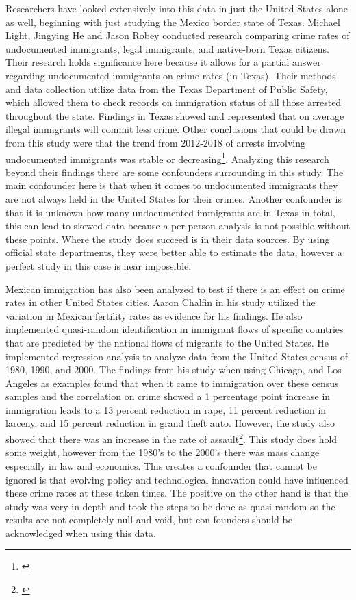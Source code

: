\documentclass[12pt,letterpaper]{article}
\begin{document}
    \indent     Researchers have looked extensively into this data in just the United States alone as well, beginning with just studying the Mexico border state of Texas. Michael Light, Jingying He and Jason Robey conducted research comparing crime rates of undocumented immigrants, legal immigrants, and native-born Texas citizens. Their research holds significance here because it allows for a partial answer regarding undocumented immigrants on crime rates (in Texas). Their methods and data collection utilize data from the Texas Department of Public Safety, which allowed them to check records on immigration status of all those arrested throughout the state. Findings in Texas showed and represented that on average illegal immigrants will commit less crime. Other conclusions that could be drawn from this study were that the trend from 2012-2018 of arrests involving undocumented immigrants was stable or decreasing\footnote{\citep{L_J_J}}. Analyzing this research beyond their findings there are some confounders surrounding in this study. The main confounder here is that when it comes to undocumented immigrants they are not always held in the United States for their crimes. Another confounder is that it is unknown how many undocumented immigrants are in Texas in total, this can lead to skewed data because a per person analysis is not possible without these points. Where the study does succeed is in their data sources. By using official state departments, they were better able to estimate the data, however a perfect study in this case is near impossible.
    
    \indent     Mexican immigration has also been analyzed to test if there is an effect on crime rates in other United States cities. Aaron Chalfin in his study utilized the variation in Mexican fertility rates as evidence for his findings. He also implemented quasi-random identification in immigrant flows of specific countries that are predicted by the national flows of migrants to the United States. He implemented regression analysis to analyze data from the United States census of 1980, 1990, and 2000. The findings from his study when using Chicago, and Los Angeles as examples found that when it came to immigration over these census samples and the correlation on crime showed a 1 percentage point increase in immigration leads to a 13 percent reduction in rape, 11 percent reduction in larceny, and 15 percent reduction in grand theft auto. However, the study also showed that there was an increase in the rate of assault\footnote{\citep{C_Aaron}}. This study does hold some weight, however from the 1980’s to the 2000’s there was mass change especially in law and economics. This creates a confounder that cannot be ignored is that evolving policy and technological innovation could have influenced these crime rates at these taken times. The positive on the other hand is that the study was very in depth and took the steps to be done as quasi random so the results are not completely null and void, but con-founders should be 
    acknowledged when using this data.
   
\end{document}
